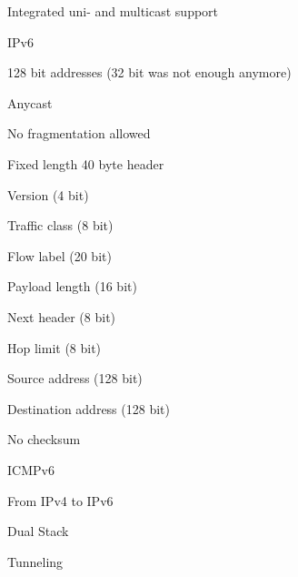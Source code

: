 				\item Integrated uni- and multicast support
			\enumend
		\enumend
	\enumend
	\item IPv6
	\enumstart
		\item 128 bit addresses (32 bit was not enough anymore)
		\item Anycast
		\item No fragmentation allowed
		\item Fixed length 40 byte header
		\enumstart
			\item Version (4 bit)
			\item Traffic class (8 bit)
			\item Flow label (20 bit)
			\item Payload length (16 bit)
			\item Next header (8 bit)
			\item Hop limit (8 bit)
			\item Source address (128 bit)
			\item Destination address (128 bit)
		\enumend
		\item No checksum
		\item ICMPv6
		\item From IPv4 to IPv6
		\enumstart
			\item Dual Stack
			\item Tunneling
		\enumend
	\enumend
\enumend
